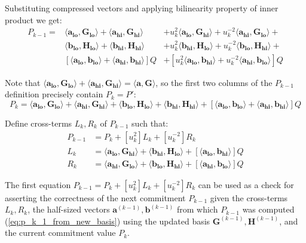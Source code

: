 \documentclass[../lecture-notes-148x210.tex]{subfiles}
\begin{document}
Substituting compressed vectors and applying bilinearity property of inner product we get:
\begin{align*}
    P_{k-1} = & \langle \mathbf{a_{lo}}, \mathbf{G_{lo}}\rangle + \langle \mathbf{a_{hi}}, \mathbf{G_{hi}}\rangle &+ u_k^2\langle \mathbf{a_{lo}}, \mathbf{G_{hi}}\rangle + u_k^{-2}\langle \mathbf{a_{hi}}, \mathbf{G_{lo}}\rangle + \\
    & \langle \mathbf{b_{lo}}, \mathbf{H_{lo}}\rangle + \langle \mathbf{b_{hi}}, \mathbf{H_{hi}}\rangle &+ u_k^2\langle \mathbf{b_{hi}}, \mathbf{H_{lo}}\rangle + u_k^{-2}\langle \mathbf{b_{lo}}, \mathbf{H_{hi}}\rangle + \\
    & [\langle \mathbf{a_{lo}}, \mathbf{b_{lo}}\rangle + \langle \mathbf{a_{hi}}, \mathbf{b_{hi}}\rangle]Q &+ [u_k^2\langle \mathbf{a_{lo}}, \mathbf{b_{hi}}\rangle + u_k^{-2}\langle \mathbf{a_{hi}}, \mathbf{b_{lo}}\rangle]Q
\end{align*}

Note that $\langle \mathbf{a_{lo}}, \mathbf{G_{lo}}\rangle + \langle \mathbf{a_{hi}}, \mathbf{G_{hi}}\rangle = \langle \mathbf{a,G}\rangle$, so the first two columns of the $P_{k-1}$ definition precisely contain $P_{k} = P'$:
$$P_{k} = \langle \mathbf{a_{lo}}, \mathbf{G_{lo}}\rangle + \langle \mathbf{a_{hi}}, \mathbf{G_{hi}}\rangle + \langle \mathbf{b_{lo}}, \mathbf{H_{lo}}\rangle + \langle \mathbf{b_{hi}}, \mathbf{H_{hi}}\rangle + [\langle \mathbf{a_{lo}}, \mathbf{b_{lo}}\rangle + \langle \mathbf{a_{hi}}, \mathbf{b_{hi}}\rangle]Q$$

Define cross-terms $L_k, R_k$ of $P_{k-1}$ such that:
\begin{align*}
    P_{k-1} &= P_k + [u_k^2] L_k + [u_k^{-2}] R_k \\
    L_{k} &= \langle \mathbf{a_{lo}}, \mathbf{G_{hi}}\rangle + \langle \mathbf{b_{hi}}, \mathbf{H_{lo}}\rangle + [\langle \mathbf{a_{lo}}, \mathbf{b_{hi}}\rangle]Q \\
    R_{k} &= \langle \mathbf{a_{hi}}, \mathbf{G_{lo}}\rangle + \langle \mathbf{b_{lo}}, \mathbf{H_{hi}}\rangle + [\langle \mathbf{a_{hi}}, \mathbf{b_{lo}}\rangle]Q
\end{align*}

The first equation $P_{k-1} = P_k + [u_k^2] L_k + [u_k^{-2}] R_k$ can be used as a check for asserting the correctness of the next commitment $P_{k-1}$ given the cross-terms $L_k, R_k$, the half-sized vectors $\mathbf{a}^{(k-1)}, \mathbf{b}^{(k-1)}$ from which $P_{k-1}$ was computed (\ref{eq:p_k_1_from_new_basis}) using the updated basis $\mathbf{G}^{(k-1)}, \mathbf{H}^{(k-1)}$, and the current commitment value $P_k$.
\end{document}
